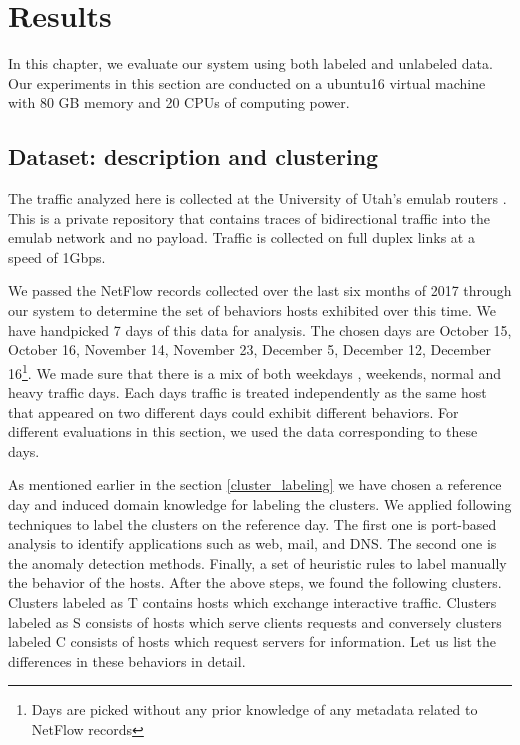 
\chapter{Results}

In this chapter, we evaluate our system using both labeled and unlabeled data. Our experiments in this section are conducted on a ubuntu16 virtual machine with 80 GB memory and 20 CPUs of computing power. 

\section{Dataset: description and clustering} \label{dataset_description}
The traffic analyzed here is collected at the University of Utah's emulab routers \cite{White+:osdi02}. This is a private repository that contains traces of bidirectional traffic into the emulab network and no payload. Traffic is collected on full duplex links at a speed of 1Gbps.

We passed the NetFlow records collected over the last six months of 2017 through our system to determine the set of behaviors hosts exhibited over this time. We have handpicked 7 days of this data for analysis. The chosen days are October 15, October 16, November 14, November 23, December 5, December 12, December 16\footnote{Days are picked without any prior knowledge of any metadata related to NetFlow records}. We made sure that there is a mix of both weekdays , weekends, normal and heavy traffic days. Each days traffic is treated independently as the same host that appeared on two different days could exhibit different behaviors. For different evaluations in this section, we used the data corresponding to these days.

As mentioned earlier in the section \ref{cluster_labeling} we have chosen a reference day and induced domain knowledge for labeling the clusters. We applied following techniques to label the clusters on the reference day. The first one is port-based analysis to identify applications such as web, mail, and DNS. The second one is the anomaly detection methods. Finally, a set of heuristic rules to label manually the behavior of the hosts. After the above steps, we found the following clusters. Clusters labeled as T contains hosts which exchange interactive traffic. Clusters labeled as S consists of hosts which serve clients requests and conversely clusters labeled C consists of hosts which request servers for information. Let us list the differences in these behaviors in detail.

